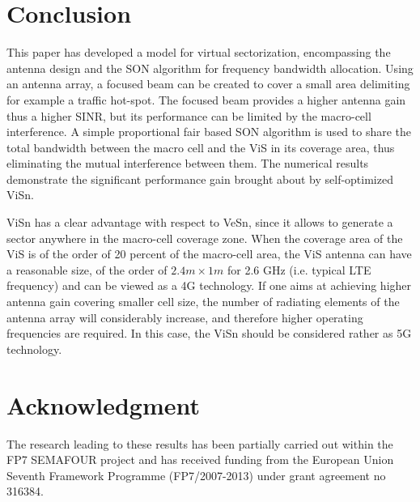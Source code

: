 \documentclass[conference]{IEEEtran}
\begin{document}
\section{Conclusion} \label{sec:conclusion}
	This paper has developed a model for virtual sectorization, encompassing the antenna design and the \ac{SON} algorithm for frequency bandwidth allocation. Using an antenna array, a focused beam can be created to cover a small area delimiting for example a traffic hot-spot. The focused beam provides a higher antenna gain thus a higher \ac{SINR}, but its performance can be limited by the macro-cell interference. A simple proportional fair based \ac{SON} algorithm is used to share the total bandwidth between the macro cell and the \ac{ViS} in its coverage area, thus eliminating the mutual interference between them. The numerical results demonstrate the significant performance gain brought about by self-optimized \ac{ViSn}.

	\ac{ViSn} has a clear advantage with respect to \ac{VeSn}, since it allows to generate a sector anywhere in the macro-cell coverage zone. When the coverage area of the \ac{ViS} is of the order of 20 percent of the macro-cell area, the \ac{ViS} antenna can have a reasonable size, of the order of $2.4m \times 1m$ for 2.6 GHz (i.e. typical \ac{LTE} frequency) and can be viewed as a 4G technology. If one aims at achieving higher antenna gain covering smaller cell size, the number of radiating elements of the antenna array will considerably increase, and therefore higher operating frequencies are required. In this case, the \ac{ViSn} should be considered rather as 5G technology.


\section*{Acknowledgment}
	The research leading to these results has been partially carried out within the FP7 SEMAFOUR project and has received funding from the European Union Seventh Framework Programme (FP7/2007-2013) under grant agreement no 316384.




\end{document}
